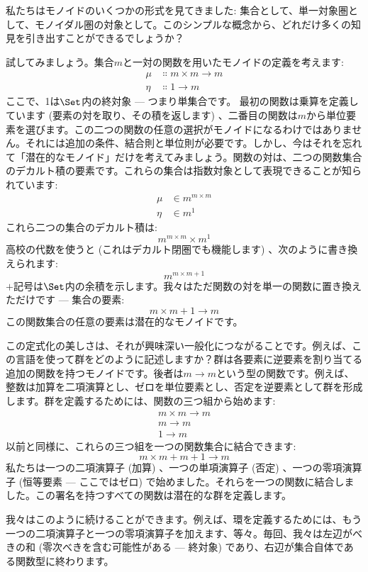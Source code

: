 
\lettrine[lhang=0.17]{私}{たち}はモノイドのいくつかの形式を見てきました: 集合として、単一対象圏として、モノイダル圏の対象として。このシンプルな概念から、どれだけ多くの知見を引き出すことができるでしょうか？

試してみましょう。集合$m$と一対の関数を用いたモノイドの定義を考えます: 
\begin{align*}
  \mu  & \Colon m\times{}m \to m \\
  \eta & \Colon 1 \to m
\end{align*}
ここで、1は$\Set$内の終対象 --- つまり単集合です。
最初の関数は乗算を定義しています (要素の対を取り、その積を返します) 、二番目の関数は$m$から単位要素を選びます。この二つの関数の任意の選択がモノイドになるわけではありません。それには追加の条件、結合則と単位則が必要です。しかし、今はそれを忘れて「潜在的なモノイド」だけを考えてみましょう。関数の対は、二つの関数集合のデカルト積の要素です。これらの集合は指数対象として表現できることが知られています: 
\begin{align*}
  \mu  & \in m^{m\times{}m} \\
  \eta & \in m^1
\end{align*}
これら二つの集合のデカルト積は: 
\[m^{m\times{}m}\times{}m^1\]
高校の代数を使うと (これはデカルト閉圏でも機能します) 、次のように書き換えられます: 
\[m^{m\times{}m + 1}\]
$+$記号は$\Set$内の余積を示します。我々はただ関数の対を単一の関数に置き換えただけです --- 集合の要素: 
\[m\times{}m + 1 \to m\]
この関数集合の任意の要素は潜在的なモノイドです。

この定式化の美しさは、それが興味深い一般化につながることです。例えば、この言語を使って群をどのように記述しますか？群は各要素に逆要素を割り当てる追加の関数を持つモノイドです。後者は$m \to m$という型の関数です。例えば、整数は加算を二項演算とし、ゼロを単位要素とし、否定を逆要素として群を形成します。群を定義するためには、関数の三つ組から始めます: 
\begin{align*}
  m\times{}m \to m \\
  m \to m          \\
  1 \to m
\end{align*}
以前と同様に、これらの三つ組を一つの関数集合に結合できます: 
\[m\times{}m + m + 1 \to m\]
私たちは一つの二項演算子 (加算) 、一つの単項演算子 (否定) 、一つの零項演算子 (恒等要素 --- ここではゼロ) で始めました。それらを一つの関数に結合しました。この署名を持つすべての関数は潜在的な群を定義します。

我々はこのように続けることができます。例えば、環を定義するためには、もう一つの二項演算子と一つの零項演算子を加えます、等々。毎回、我々は左辺がべきの和 (零次べきを含む可能性がある --- 終対象) であり、右辺が集合自体である関数型に終わります。

